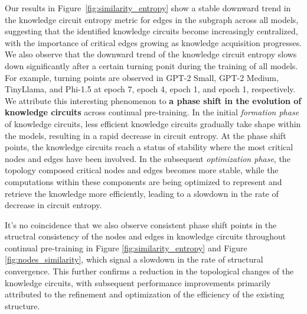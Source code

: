 
Our results in Figure~\ref{fig:similarity_entropy} show a stable downward trend in the knowledge circuit entropy metric for edges in the subgraph across all models, suggesting that the identified knowledge circuits become increasingly centralized, with the importance of critical edges growing as knowledge acquisition progresses.
We also observe that the downward trend of the knowledge circuit entropy slows down significantly after a certain turning ponit during the training of all models.
For example, turning points are observed in GPT-2 Small, GPT-2 Medium, TinyLlama, and Phi-1.5 at epoch 7, epoch 4, epoch 1, and epoch 1, respectively.
We attribute this interesting phenomenon to \textbf{a phase shift in the evolution of knowledge circuits} across continual pre-training.
In the initial \textit{formation phase} of knowledge circuits, less efficient knowledge circuits gradually take shape within the models, resulting in a rapid decrease in circuit entropy.
At the phase shift points, the knowledge circuits reach a status of stability where the most critical nodes and edges have been involved.
In the subsequent \textit{optimization phase}, the topology composed critical nodes and edges becomes more stable, while the computations within these components are being optimized to represent and retrieve the knowledge more efficiently, leading to a slowdown in the rate of decrease in circuit entropy.

It's no coincidence that we also observe consistent phase shift points in the structral consistency of the nodes and edges in knowledge circuits throughout continual pre-training in Figure \ref{fig:similarity_entropy} and Figure \ref{fig:nodes_similarity}, which signal a slowdown in the rate of structural convergence.
This further confirms a reduction in the topological changes of the knowledge circuits, with subsequent performance improvements primarily attributed to the refinement and optimization of the efficiency of the existing structure.

